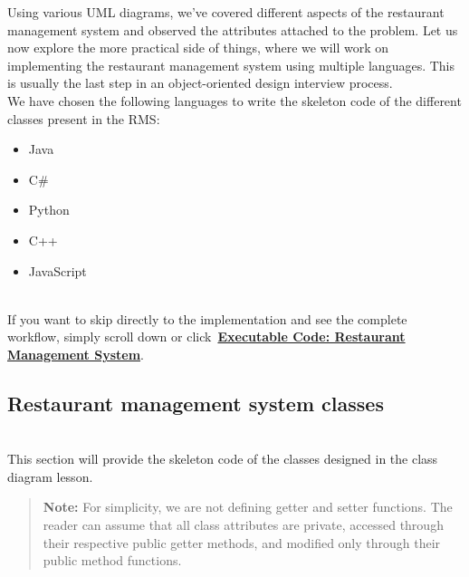 

Using various UML diagrams, we've covered different aspects of the restaurant management system and observed the attributes attached to the problem. Let us now explore the more practical side of things, where we will work on implementing the restaurant management system using multiple languages. This is usually the last step in an object-oriented design interview process.
\\
We have chosen the following languages to write the skeleton code of the different classes present in the RMS:

\begin{itemize}
\item
\protect{}\label{9gbpbWMATvxhjjXl8Jmvo}
Java
\item
\protect{}\label{OD8EWKb4P5zGnS1zZ6LIB}
C\#
\item
\protect{}\label{Qti0acj3_tOqmeDJNahjW}
Python
\item
\protect{}\label{D-5nimmGFlFaza0RVuS13}
C++
\item
\protect{}\label{x2v9xv47mI6Pbnc-puY3h}
JavaScript
\end{itemize}
\\
If you want to skip directly to the implementation and see the complete workflow, simply scroll down or click~\hyperref[Executable-code-Restaurant-management-system]{\textbf{Executable Code: Restaurant Management System}}.

\subsection{Restaurant management system classes}\label{POzloCZVxSWlBPGNIUA-K}
\\
This section will provide the skeleton code of the classes designed in the class diagram lesson.
\begin{quote}
\textbf{Note:} For simplicity, we are not defining getter and setter functions. The reader can assume that all class attributes are private, accessed through their respective public getter methods, and modified only through their public method functions.
\end{quote}
